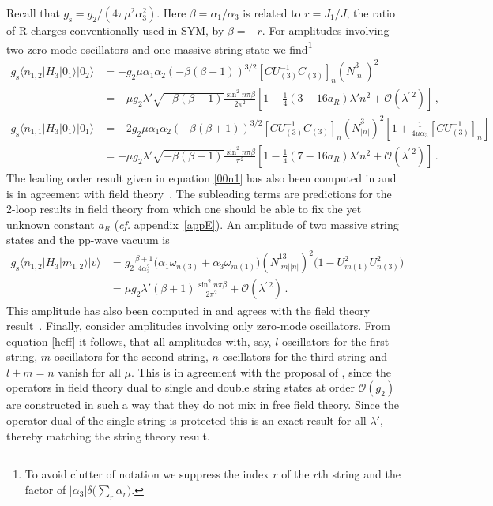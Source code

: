 \documentclass[12pt]{article}
\def\a{\alpha}
\def\b{\beta}
\def\d{\delta}
\def\m{\mu}
\def\l{\lambda}
\def\o{\omega}
\def\mc{\mathcal}
\def\la{\langle}
\def\ra{\rangle}
\numberwithin{equation}{section} \setlength{\textwidth}{17cm}
\begin{document}
Recall that $g_{\text{s}}=g_2/(4\pi\m^2\a_3^2)$. 
Here $\b=\a_1/\a_3$ is related to $r=J_1/J$, the ratio of R-charges 
conventionally used in SYM, by $\b=-r$.
For amplitudes involving two zero-mode oscillators and one massive string state
we find\footnote{To avoid clutter of notation we suppress the index $r$ of the $r$th string and the factor of 
$|\a_3|\d\bigl(\sum_r\a_r\bigr)$.}
\begin{align}
g_{\text{s}}\la n_{1,2}|H_3|0_1\ra|0_2\ra & =
-g_2\m\a_1\a_2(-\b(\b+1))^{3/2}\left[CU_{(3)}^{-1}C_{(3)}\right]_n
\left(\bar{N}^3_{|n|}\right)^2\nonumber\\
\label{00n1}
&=-\m g_2\l'\sqrt{-\b(\b+1)}\frac{\sin^2n\pi\b}{2\pi^2}
\left[1-\frac{1}{4}(3-16a_R)\l'n^2+{\mc O}(\l^{\prime\,2})\right]\,,\\
g_{\text{s}}\la n_{1,1}|H_3|0_1\ra|0_1\ra & =
-2g_2\m\a_1\a_2(-\b(\b+1))^{3/2}\left[CU_{(3)}^{-1}C_{(3)}\right]_n\left(\bar{N}^3_{|n|}\right)^2
\left[1+\frac{1}{4\m\a_3}\left[CU_{(3)}^{-1}\right]_n\right]\nonumber\\
\label{00n2}
& =-\m g_2\l'\sqrt{-\b(\b+1)}\frac{\sin^2n\pi\b}{\pi^2}
\left[1-\frac{1}{4}(7-16a_R)\l'n^2+{\mc O}(\l^{\prime\,2})\right]\,.
\end{align}
The leading order result given in equation \eqref{00n1} has also been computed in
\cite{vsv,gomis} and is in agreement with field theory~\cite{jan2,freedman2}. The subleading terms are
predictions for the 2-loop results in field theory from which one should be able to
fix the yet unknown constant $a_R$ ({\it cf.} appendix~\ref{appE}). An amplitude of two
massive string states and the pp-wave vacuum is
\begin{align}
g_{\text{s}}\la n_{1,2}|H_3|m_{1,2}\ra|v\ra & =
g_2\frac{\b+1}{4\a_3^2}\bigl(\a_1\o_{n(3)}+\a_3\o_{m(1)}\bigr)
\left(\bar{N}^{13}_{|m||n|}\right)^2\bigl(1-U_{m(1)}^2U_{n(3)}^2\bigr)\nonumber\\
\label{m0n}
&=\m g_2\l'(\b+1)\frac{\sin^2n\pi\b}{2\pi^2}+{\mc O}(\l^{\prime\,2})\,.
\end{align}
This amplitude has also been computed in \cite{vsv,gomis} and agrees with
the field theory result~\cite{jan2,freedman2}. Finally, consider amplitudes
involving only zero-mode oscillators. From equation \eqref{heff} it follows, that
all amplitudes with, say, $l$ oscillators for the first string, $m$ oscillators for the
second string, $n$ oscillators for the third string and $l+m=n$ vanish for all $\m$.
This is in agreement with the proposal of \cite{vv,vsv,gomis}, since 
the operators
in field theory dual to single and double string states at order ${\mc O}(g_2)$ are
constructed in such a way that they do not mix in free field theory. Since the operator 
dual of the single string is protected this is an exact result for all $\l'$, thereby matching the
string theory result. 
\end{document}
